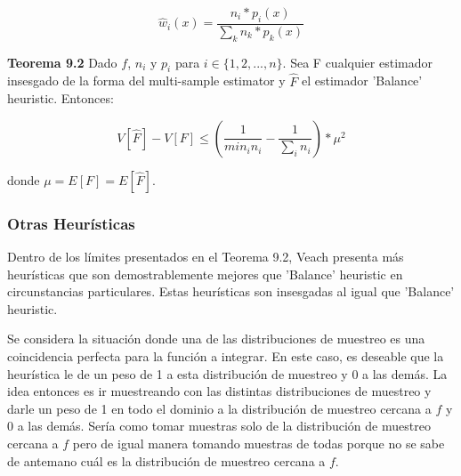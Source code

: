 \documentclass{article}
\begin{document}
$$ \hat{w}_{i}(x) = \frac{n_{i} * p_{i}(x)}{\sum_{k} n_{k} * p_{k}(x)}$$

\textbf{Teorema 9.2} Dado $f$, $n_{i}$ y $p_{i}$ para $i \in \{1, 2, ..., n\}$. Sea F cualquier estimador insesgado de la forma del multi-sample estimator y $\hat{F}$ el estimador 'Balance' heuristic. Entonces:

$$V[\hat{F}] - V[F] \leq ( \frac{1}{min_{i} n_{i}} - \frac{1}{\sum_{i} n_{i}} ) * \mu^{2}$$

donde $\mu = E[F] = E[\hat{F}]$.









\subsubsection{Otras Heurísticas}

Dentro de los límites presentados en el Teorema 9.2, Veach presenta más heurísticas que son demostrablemente mejores que 'Balance' heuristic en circunstancias particulares.
Estas heurísticas son insesgadas al igual que 'Balance' heuristic.

Se considera la situación donde una de las distribuciones de muestreo es una coincidencia perfecta para la función a integrar. En este caso, es deseable que la heurística le de un peso de 1 a esta distribución de muestreo y 0 a las demás.
La idea entonces es ir muestreando con las distintas distribuciones de muestreo y darle un peso de 1 en todo el dominio a la distribución de muestreo cercana a $f$ y 0 a las demás.
Sería como tomar muestras solo de la distribución de muestreo cercana a $f$ pero de igual manera tomando muestras de todas porque no se sabe de antemano cuál es la distribución de muestreo cercana a $f$.
\end{document}
